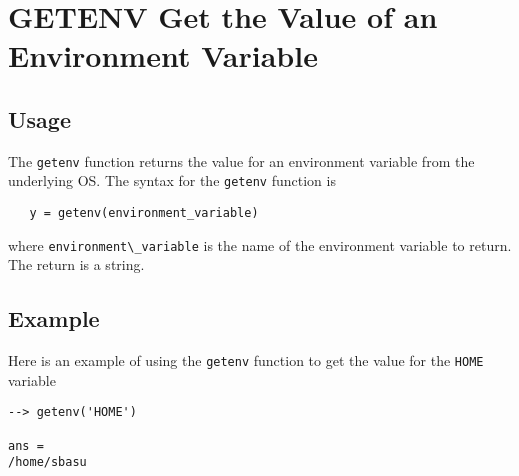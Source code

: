 \section{GETENV Get the Value of an Environment Variable}

\subsection{Usage}

The \verb|getenv| function returns the value for an environment
variable from the underlying OS.  The syntax for the \verb|getenv|
function is 
\begin{verbatim}
   y = getenv(environment_variable)
\end{verbatim}
where \verb|environment\_variable| is the name of the environment
variable to return.  The return is a string.
\subsection{Example}

Here is an example of using the \verb|getenv| function to
get the value for the \verb|HOME| variable
\begin{verbatim}
--> getenv('HOME')

ans = 
/home/sbasu
\end{verbatim}

